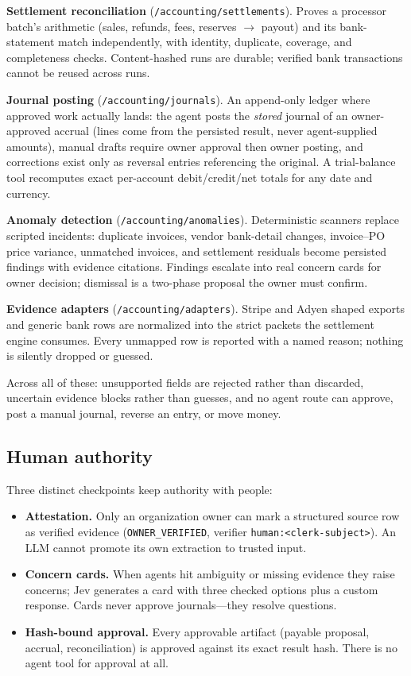 \documentclass[11pt]{article}
\begin{document}
\textbf{Settlement reconciliation} (\texttt{/accounting/settlements}). Proves a processor batch's arithmetic (sales, refunds, fees, reserves $\rightarrow$ payout) and its bank-statement match independently, with identity, duplicate, coverage, and completeness checks. Content-hashed runs are durable; verified bank transactions cannot be reused across runs.

\textbf{Journal posting} (\texttt{/accounting/journals}). An append-only ledger where approved work actually lands: the agent posts the \emph{stored} journal of an owner-approved accrual (lines come from the persisted result, never agent-supplied amounts), manual drafts require owner approval then owner posting, and corrections exist only as reversal entries referencing the original. A trial-balance tool recomputes exact per-account debit/credit/net totals for any date and currency.

\textbf{Anomaly detection} (\texttt{/accounting/anomalies}). Deterministic scanners replace scripted incidents: duplicate invoices, vendor bank-detail changes, invoice--PO price variance, unmatched invoices, and settlement residuals become persisted findings with evidence citations. Findings escalate into real concern cards for owner decision; dismissal is a two-phase proposal the owner must confirm.

\textbf{Evidence adapters} (\texttt{/accounting/adapters}). Stripe and Adyen shaped exports and generic bank rows are normalized into the strict packets the settlement engine consumes. Every unmapped row is reported with a named reason; nothing is silently dropped or guessed.

Across all of these: unsupported fields are rejected rather than discarded, uncertain evidence blocks rather than guesses, and no agent route can approve, post a manual journal, reverse an entry, or move money.

\subsection{Human authority}

Three distinct checkpoints keep authority with people:

\begin{itemize}
\item \textbf{Attestation.} Only an organization owner can mark a structured source row as verified evidence (\texttt{OWNER\_VERIFIED}, verifier \texttt{human:<clerk-subject>}). An LLM cannot promote its own extraction to trusted input.
\item \textbf{Concern cards.} When agents hit ambiguity or missing evidence they raise concerns; Jev generates a card with three checked options plus a custom response. Cards never approve journals---they resolve questions.
\item \textbf{Hash-bound approval.} Every approvable artifact (payable proposal, accrual, reconciliation) is approved against its exact result hash. There is no agent tool for approval at all.
\end{itemize}
\end{document}
